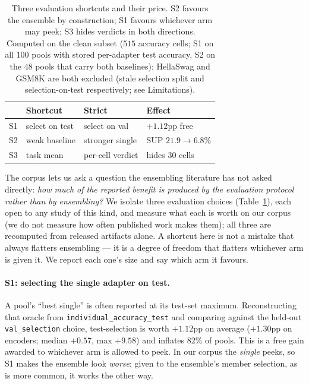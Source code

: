 \documentclass[11pt]{article}
\begin{document}
\begin{table}[t]
\centering\small
\setlength{\tabcolsep}{3.5pt}
\caption{Three evaluation shortcuts and their price. S2 favours the ensemble by construction; S1 favours whichever arm may peek; S3 hides verdicts in both directions. Computed on the clean subset ($515$ accuracy cells; S1 on all $100$ pools with stored per-adapter test accuracy, S2 on the $48$ pools that carry both baselines); HellaSwag and GSM8K are both excluded (stale selection split and selection-on-test respectively; see Limitations).}
\label{tab:protocol}
\begin{tabular}{@{}llll@{}}
\toprule
& Shortcut & Strict & Effect \\
\midrule
S1 & select on test & select on val & $+1.12$pp free \\
S2 & weak baseline & stronger single & SUP $21.9\!\to\!6.8\%$ \\
S3 & task mean & per-cell verdict & hides $30$ cells \\
\bottomrule
\end{tabular}
\end{table}

The corpus lets us ask a question the ensembling literature has not asked directly: \emph{how much of the reported benefit is produced by the evaluation protocol rather than by ensembling?} We isolate three evaluation choices (Table~\ref{tab:protocol}), each open to any study of this kind, and measure what each is worth on our corpus (we do not measure how often published work makes them); all three are recomputed from released artifacts alone. A shortcut here is not a mistake that always flatters ensembling --- it is a degree of freedom that flatters whichever arm is given it. We report each one's size and say which arm it favours.

\paragraph{S1: selecting the single adapter on test.} A pool's ``best single'' is often reported at its test-set maximum. Reconstructing that oracle from \texttt{individual\_\allowbreak accuracy\_\allowbreak test} and comparing against the held-out \texttt{val\_selection} choice, test-selection is worth $+1.12$pp on average ($+1.30$pp on encoders; median $+0.57$, max $+9.58$) and inflates $82\%$ of pools. This is a free gain awarded to whichever arm is allowed to peek. In our corpus the \emph{single} peeks, so S1 makes the ensemble look \emph{worse}; given to the ensemble's member selection, as is more common, it works the other way.
\end{document}
